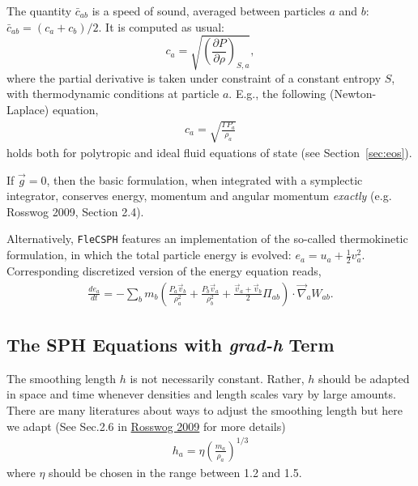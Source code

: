 \documentclass[notes.tex]{subfiles}
\begin{document}
The quantity $\bar{c}_{ab}$ is a speed of sound, averaged between particles
$a$ and $b$: $\bar{c}_{ab} = (c_a + c_b)/2$. It is computed as usual:
\begin{equation}
c_a = \sqrt{\left(\frac{\partial P}{\partial \rho}\right)_{S,a}},
\end{equation}
where the partial derivative is taken under constraint of a constant entropy
$S$, with thermodynamic conditions at particle $a$.
E.g., the following (Newton-Laplace) equation,
\begin{align}
  c_a = \sqrt{\frac{\Gamma P_a}{\rho_a}}
\end{align}
holds both for polytropic and ideal fluid equations of state (see
Section~\ref{sec:eos}).

If $\vec{g}=0$, then the basic formulation, when integrated with a symplectic
integrator, conserves energy, momentum and angular momentum \emph{exactly}
(e.g. Rosswog 2009, Section 2.4).

Alternatively, \texttt{FleCSPH} features an implementation of the so-called thermokinetic formulation, 
in which the total particle energy is evolved: $e_a = u_a + \frac{1}{2} v_a^2$. 
Corresponding discretized version of the energy equation reads,
\begin{align}
    \label{eqn:thermo}
    \frac{d e_a}{dt} 
      = - \sum_b m_b \left( 
             \frac{P_a \vec{v}_b}{\rho_a^2} + \frac{P_b \vec{v}_a}{\rho_b^2}
             + \frac{\vec{v}_a+\vec{v}_b}{2} \Pi_{ab}\right) \cdot \vec\nabla_a W_{ab}.
\end{align}

\subsection{The SPH Equations with {\it grad-h} Term}
The smoothing length $h$ is not necessarily constant. Rather, $h$ should 
be adapted in space and time whenever densities and length scales vary 
by large amounts. There are many literatures about ways to adjust the 
smoothing length but here we adapt 
(See Sec.2.6 in \href{https://arxiv.org/pdf/0903.5075.pdf}{Rosswog 2009} for more details)
\begin{align}
\label{eqn:grad-h:adap-h}
h_a = \eta \left( \frac{m_a}{\rho_a} \right)^{1/3} 
\end{align}
where $\eta$ should be chosen in the range between 1.2 and 1.5.
\end{document}
